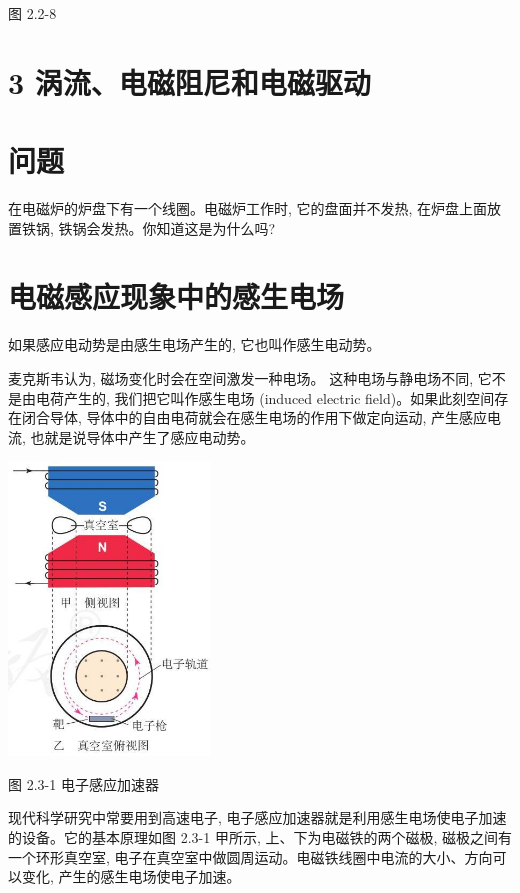 \documentclass[10pt]{article}
\begin{document}
图 2.2-8

\section*{3 涡流、电磁阻尼和电磁驱动}

\section*{问题}

在电磁炉的炉盘下有一个线圈。电磁炉工作时, 它的盘面并不发热, 在炉盘上面放置铁锅, 铁锅会发热。你知道这是为什么吗?

\section*{电磁感应现象中的感生电场}

\begin{mdframed}

如果感应电动势是由感生电场产生的, 它也叫作感生电动势。

\end{mdframed}

麦克斯韦认为, 磁场变化时会在空间激发一种电场。 这种电场与静电场不同, 它不是由电荷产生的, 我们把它叫作感生电场 (induced electric field)。如果此刻空间存在闭合导体, 导体中的自由电荷就会在感生电场的作用下做定向运动, 产生感应电流, 也就是说导体中产生了感应电动势。

\begin{center}
\includegraphics[max width=0.4\textwidth]{images/01910e72-c5b7-7ed5-a6d4-fb3a5faefc32_40_382828.jpg}
\end{center}

图 2.3-1 电子感应加速器

现代科学研究中常要用到高速电子, 电子感应加速器就是利用感生电场使电子加速的设备。它的基本原理如图 2.3-1 甲所示, 上、下为电磁铁的两个磁极, 磁极之间有一个环形真空室, 电子在真空室中做圆周运动。电磁铁线圈中电流的大小、方向可以变化, 产生的感生电场使电子加速。
\end{document}
